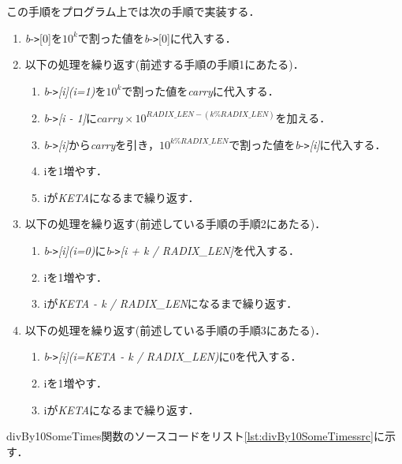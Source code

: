 \documentclass[a4paper,11pt,dvipdfmx]{jsarticle}
\begin{document}
この手順をプログラム上では次の手順で実装する．

\begin{enumerate}
    \item \textit{b}-\verb|>|[0]を$10^k$で割った値を\textit{b}-\verb|>|[0]に代入する．
    \item 以下の処理を繰り返す(前述する手順の手順1にあたる)．
    \begin{enumerate}
    \item \textit{b}-\verb|>|\textit{[i](i=1)}を$10^k$で割った値を\textit{carry}に代入する．
    \item \textit{b}-\verb|>|\textit{[i - 1]}に$carry \times 10^{RADIX\_LEN - (k \% RADIX\_LEN)}$を加える．
    \item \textit{b}-\verb|>|\textit{[i]}から\textit{carry}を引き，$10^{k \% RADIX\_LEN}$で割った値を\textit{b}-\verb|>|\textit{[i]}に代入する．
    \item iを1増やす．
    \item iが\textit{KETA}になるまで繰り返す．
    \end{enumerate}
    \item 以下の処理を繰り返す(前述している手順の手順2にあたる)．
    \begin{enumerate}
        \item \textit{b}-\verb|>|\textit{[i](i=0)}に\textit{b}-\verb|>|\textit{[i + k / RADIX\_LEN]}を代入する．
        \item iを1増やす．
        \item iが\textit{KETA - k / RADIX\_LEN}になるまで繰り返す．
    \end{enumerate}
    \item 以下の処理を繰り返す(前述している手順の手順3にあたる)．
    \begin{enumerate}
        \item \textit{b}-\verb|>|\textit{[i](i=KETA - k / RADIX\_LEN)}に0を代入する．
        \item iを1増やす．
        \item iが\textit{KETA}になるまで繰り返す．
    \end{enumerate}
\end{enumerate}

divBy10SomeTimes関数のソースコードをリスト\ref{lst:divBy10SomeTimessrc}に示す．
\end{document}
